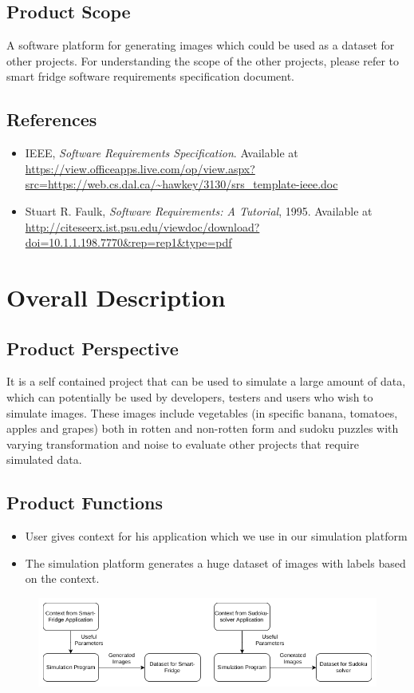 \documentclass[a4paper,12pt]{article}
\begin{document}
\subsection{Product Scope}
A software platform for generating images which could be used as a dataset for other projects. For understanding the scope of the other projects, please refer to smart fridge software requirements specification document.
\subsection{References}
\begin{itemize}
\item IEEE, \textit{Software Requirements Specification}. Available at \url{https://view.officeapps.live.com/op/view.aspx?src=https://web.cs.dal.ca/~hawkey/3130/srs_template-ieee.doc}
\item Stuart R. Faulk, \textit{Software Requirements: A Tutorial}, 1995. Available at \url{http://citeseerx.ist.psu.edu/viewdoc/download?doi=10.1.1.198.7770&rep=rep1&type=pdf}
\end{itemize}
\newpage
\section{Overall Description}
\subsection{Product Perspective}
It is a self contained project that can be used to simulate a large amount of data, which can potentially be used by developers, testers and users who wish to simulate images. These images include vegetables (in specific banana, tomatoes, apples and grapes) both in rotten and non-rotten form and sudoku puzzles with varying transformation and noise to evaluate other projects that require simulated data.

\subsection{Product Functions}
\begin{itemize}
\item User gives context for his application which we use in our simulation platform
\item The simulation platform generates a huge dataset of images with labels based on the context.
\end{itemize}

\begin{figure}[H]
\includegraphics[scale=0.6]{sys_sw.png}
\end{figure}
\end{document}
